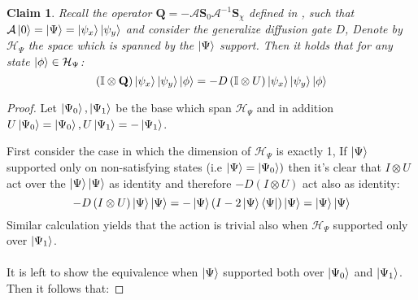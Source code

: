 \documentclass{article}
\newtheorem{claim}{Claim}
\begin{document}
\begin{claim} \textit{ Recall the operator $\mathbf Q  = - {\mathcal A}  {\mathbf S}_0 
  {\mathcal A}^{-1}  {\mathbf S}_\chi$ defined in \cite{Brassard_2002}, such that $ \mathcal A \ket{0} = \ket{\Psi} = \ket{\psi_{x}}\ket{\psi_{y}}$ and 
consider the generalize diffusion gate $D$, Denote by $\mathcal{H}_{\Psi}$ the space which is spanned by the $\ket{\Psi}$ support. Then it holds that for any state $ \ket{\phi} \in \mathcal{H}_{\Psi} $:}
\begin{equation*}
  \left(  \mathbb{I} \otimes \mathbf Q \right) \ket{\psi_{x}}\ket{\psi_{y}} \ket{\phi} =  - D \left( \mathbb{I} \otimes U \right)  \ket{\psi_{x}}\ket{\psi_{y}} \ket{\phi} 
\end{equation*}
\end{claim}
\begin{proof} Let $\ket{\Psi_0}, \ket{\Psi_1}$ be the base which span $ \mathcal{H}_{\Psi}$ and in addition $U\ket{\Psi_0} = \ket{\Psi_0}, U\ket{\Psi_1} =- \ket{\Psi_1}$.

First consider the case in which the dimension of $ \mathcal{H}_{\Psi}$ is exactly 1, If $ \ket{\Psi} $ supported only on non-satisfying states (i.e $\ket{\Psi} = \ket{\Psi_{0}}) $ then it's clear that $ I \otimes U $ act over the $ \ket{\Psi}\ket{\Psi} $ as identity and therefore $ -D\left( I \otimes U \right) $ act also as identity: 
\begin{equation*}
  -D\left( I \otimes U \right) \ket{\Psi}\ket{\Psi} = -\ket{\Psi}\left( I - 2\ket{\Psi}\bra{\Psi}  \right) \ket{\Psi} = \ket{\Psi}\ket{\Psi}
\end{equation*}
Similar calculation yields that the action is trivial also when  $ \mathcal{H}_{\Psi}$  supported only over $ \ket{\Psi_1} $.  

\paragraph{}

It is left to show the equivalence when $\ket{\Psi}$ supported both over $\ket{\Psi_0}$ and $\ket{\Psi_1}$. Then it follows that:


\end{proof}
\end{document}
